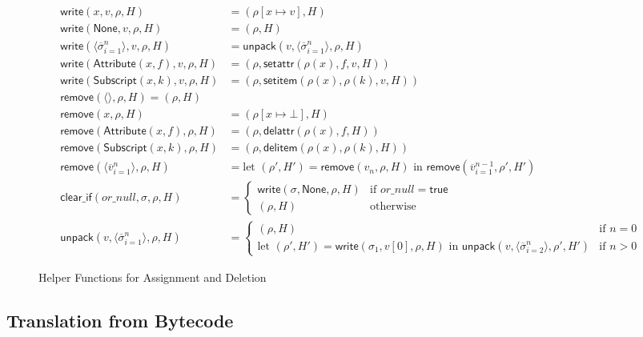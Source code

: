 \begin{figure*}[t]
\centering
\[
\begin{aligned}
\mathsf{write}(x,v,\rho,H) &= (\rho[x \mapsto v],H) \\
\mathsf{write}(\mathsf{None},v,\rho,H) &= (\rho,H) \\
\mathsf{write}(\langle\overline{\sigma}_{i=1}^{n}\rangle,v,\rho,H) &= \mathsf{unpack}(v,\langle\overline{\sigma}_{i=1}^{n}\rangle,\rho,H) \\
\mathsf{write}(\mathsf{Attribute}(x,f),v,\rho,H) &= (\rho,\mathsf{setattr}(\rho(x),f,v,H)) \\
\mathsf{write}(\mathsf{Subscript}(x,k),v,\rho,H) &= (\rho,\mathsf{setitem}(\rho(x),\rho(k),v,H)) \\[1ex]
\mathsf{remove}(\langle\rangle, \rho, H) = (\rho, H) \\
\mathsf{remove}(x,\rho,H) &= (\rho[x\mapsto \bot],H) \\
\mathsf{remove}(\mathsf{Attribute}(x,f),\rho,H) &= (\rho,\mathsf{delattr}(\rho(x),f,H)) \\
\mathsf{remove}(\mathsf{Subscript}(x,k),\rho,H) &= (\rho,\mathsf{delitem}(\rho(x),\rho(k),H)) \\
\mathsf{remove}(\langle\overline{v}_{i=1}^{n}\rangle,\rho,H) &= \text{let } (\rho',H') = \mathsf{remove}(v_n,\rho,H) \text{ in } \mathsf{remove}(\overline{v}_{i=1}^{n-1},\rho',H') \\[1ex]
\mathsf{clear\_if}(or\_null,\sigma,\rho,H) &=
\begin{cases}
\mathsf{write}(\sigma,\mathsf{None},\rho,H) & \text{if } or\_null = \mathsf{true} \\
(\rho,H) & \text{otherwise}
\end{cases} \\[1ex]
\mathsf{unpack}(v,\langle\overline{\sigma}_{i=1}^{n}\rangle,\rho,H) &= 
\begin{cases}
(\rho,H) & \text{if } n = 0 \\
\text{let } (\rho',H') = \mathsf{write}(\sigma_1,v[0],\rho,H) \text{ in } \mathsf{unpack}(v,\langle\overline{\sigma}_{i=2}^{n}\rangle,\rho',H') & \text{if } n > 0
\end{cases}
\end{aligned}
\]
\caption{Helper Functions for Assignment and Deletion}
\label{fig:helper-functions}
\end{figure*}
\subsection{Translation from Bytecode}
\label{sec:translation}

